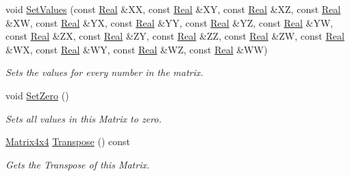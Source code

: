 \begin{DoxyCompactItemize}
{void \hyperlink{classMezzanine_1_1Matrix4x4_ad77e9326617838d731d3da66d8d2a9b8}{SetValues} (const \hyperlink{namespaceMezzanine_a726731b1a7df72bf3583e4a97282c6f6}{Real} \&XX, const \hyperlink{namespaceMezzanine_a726731b1a7df72bf3583e4a97282c6f6}{Real} \&XY, const \hyperlink{namespaceMezzanine_a726731b1a7df72bf3583e4a97282c6f6}{Real} \&XZ, const \hyperlink{namespaceMezzanine_a726731b1a7df72bf3583e4a97282c6f6}{Real} \&XW, const \hyperlink{namespaceMezzanine_a726731b1a7df72bf3583e4a97282c6f6}{Real} \&YX, const \hyperlink{namespaceMezzanine_a726731b1a7df72bf3583e4a97282c6f6}{Real} \&YY, const \hyperlink{namespaceMezzanine_a726731b1a7df72bf3583e4a97282c6f6}{Real} \&YZ, const \hyperlink{namespaceMezzanine_a726731b1a7df72bf3583e4a97282c6f6}{Real} \&YW, const \hyperlink{namespaceMezzanine_a726731b1a7df72bf3583e4a97282c6f6}{Real} \&ZX, const \hyperlink{namespaceMezzanine_a726731b1a7df72bf3583e4a97282c6f6}{Real} \&ZY, const \hyperlink{namespaceMezzanine_a726731b1a7df72bf3583e4a97282c6f6}{Real} \&ZZ, const \hyperlink{namespaceMezzanine_a726731b1a7df72bf3583e4a97282c6f6}{Real} \&ZW, const \hyperlink{namespaceMezzanine_a726731b1a7df72bf3583e4a97282c6f6}{Real} \&WX, const \hyperlink{namespaceMezzanine_a726731b1a7df72bf3583e4a97282c6f6}{Real} \&WY, const \hyperlink{namespaceMezzanine_a726731b1a7df72bf3583e4a97282c6f6}{Real} \&WZ, const \hyperlink{namespaceMezzanine_a726731b1a7df72bf3583e4a97282c6f6}{Real} \&WW)}
\label{classMezzanine_1_1Matrix4x4_ad77e9326617838d731d3da66d8d2a9b8}

\begin{DoxyCompactList}\small\item\em Sets the values for every number in the matrix. \item\end{DoxyCompactList}\item 
\hypertarget{classMezzanine_1_1Matrix4x4_a36fe24d1052b40ed0075abc4341c3b13}{
void \hyperlink{classMezzanine_1_1Matrix4x4_a36fe24d1052b40ed0075abc4341c3b13}{SetZero} ()}
\label{classMezzanine_1_1Matrix4x4_a36fe24d1052b40ed0075abc4341c3b13}

\begin{DoxyCompactList}\small\item\em Sets all values in this Matrix to zero. \item\end{DoxyCompactList}\item 
\hyperlink{classMezzanine_1_1Matrix4x4}{Matrix4x4} \hyperlink{classMezzanine_1_1Matrix4x4_a1330573388a3070bc747bad97d93d3e9}{Transpose} () const 
\begin{DoxyCompactList}\small\item\em Gets the Transpose of this Matrix. \item\end{DoxyCompactList}\end{DoxyCompactItemize}
